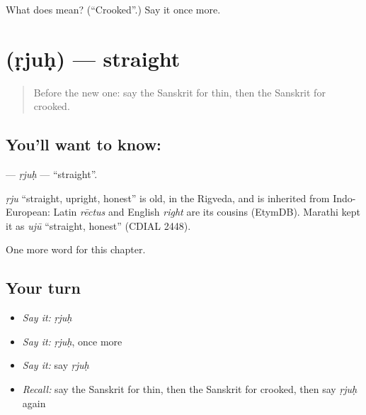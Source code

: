 \begin{tcolorbox}[breakable,colback=teal!4,colframe=teal!35!black,title={Before you move on}]
What does  mean? (\textquotedblleft{}Crooked\textquotedblright{}.) Say it once more.
\end{tcolorbox}
\section[\texorpdfstring{\sk{ऋजुः} (ṛjuḥ)}{ऋजुः (ṛjuḥ)}]{ (ṛjuḥ) — straight}

\label{lesson:SA-C132-rjuh}



\begin{quote}
Before the new one: say the Sanskrit for thin, then the Sanskrit for crooked.
\end{quote}

\subsection*{You'll want to know: }
\textbf{} — \emph{ṛjuḥ} — \textquotedblleft{}straight\textquotedblright{}.

\begin{cousinweb}
\emph{ṛju} \textquotedblleft{}straight, upright, honest\textquotedblright{} is old, in the Rigveda, and is inherited from Indo-European: Latin \emph{rēctus} and English \emph{right} are its cousins (EtymDB). Marathi kept it as \emph{ujū} \textquotedblleft{}straight, honest\textquotedblright{} (CDIAL 2448).
\end{cousinweb}

\begin{grammarlens}[title={What you've built}]
One more word for this chapter.
\end{grammarlens}

\subsection*{Your turn}
\begin{itemize}
\raggedright
  \item \emph{Say it:} \emph{ṛjuḥ}
  \item \emph{Say it:} \emph{ṛjuḥ}, once more
  \item \emph{Say it:} say \emph{ṛjuḥ}
  \item \emph{Recall:} say the Sanskrit for thin, then the Sanskrit for crooked, then say \emph{ṛjuḥ} again
\end{itemize}

